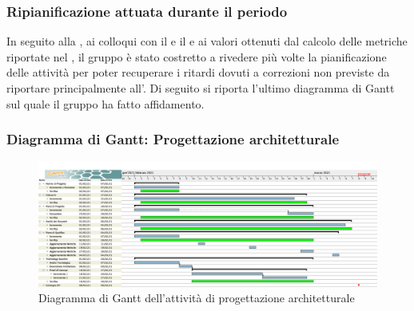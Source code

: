 \subsubsection{Ripianificazione attuata durante il periodo} \label{RipianificazionePArch}
In seguito alla , ai colloqui con il \VT e il \CR e ai valori ottenuti dal calcolo delle metriche riportate nel , il gruppo è stato costretto a rivedere più volte la pianificazione delle attività per poter recuperare i ritardi dovuti a correzioni non previste da riportare principalmente all'\AdR .
Di seguito si riporta l'ultimo diagramma di Gantt sul quale il gruppo ha fatto affidamento.
\newpage
\subsubsection{Diagramma di Gantt: Progettazione architetturale}\label{GanttArch}
\begin{figure}[ht]
    \centering
    \includegraphics[width=\textwidth]{Immagini/GanttProgettazioneArchitetturale}
    \caption{Diagramma di Gantt dell'attività di progettazione architetturale}
\end{figure}